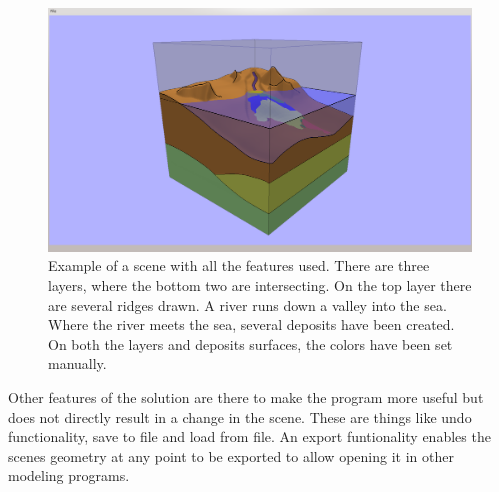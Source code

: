 \documentclass[a4paper,12pt]{report}
\begin{document}
\begin{figure}
 \includegraphics[trim = 50mm 5mm 50mm 7mm, clip,width=\linewidth]{thesis/results/allFeatures.png}
 \caption{Example of a scene with all the features used. There are three layers, where the bottom two are intersecting. On the top layer there are several ridges drawn. A river runs down a valley into the sea. Where the river meets the sea, several deposits have been created. On both the layers and deposits surfaces, the colors have been set manually.}
 \label{fig:allFeatures}
\end{figure}

Other features of the solution are there to make the program more useful but does not directly result in a change in the scene. These are things like undo functionality, save to file and load from file. An export funtionality enables the scenes geometry at any point to be exported to allow opening it in other modeling programs.
\end{document}
